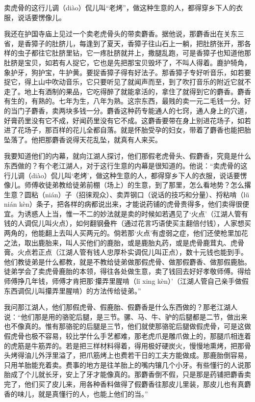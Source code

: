 \documentclass[12pt,UTF8]{ctexbook}
\begin{document}
卖虎骨的这行儿调（diào）侃儿叫“老烤”，做这种生意的人，都得穿乡下人的衣服，说话要愣像儿。



我还在护国寺庙上见过一个卖老虎骨头的带卖麝香。据他说，那麝香出在关东三省，是香獐子的肚脐儿，每逢到了夏天，香獐子往山石上一躺，把肚脐张开，那各样的虫子都往它肚脐里钻，它一疼肚脐就并上，撒腿乱跑，可是香獐子也知道他那肚脐是宝贝，如若有人捉它，它也是先把那宝贝毁坏了，不叫人得着。鹿护犄角，象护牙，狗护宝，牛护黄。要捉香獐子得有好法子。那香獐子专好听音乐，如若要捉它，得上山中吹动音乐，它只要听见了就闻声而至，到了吹打音乐的附近它就不走了。地上有酒制的果品，它吃得醉了就能拿活的，拿住了就得到它的麝香。麝香有生的，有熟的。七年为生，八年为熟。这宗东西，最贱的卖一元二毛钱一分。好的当门子麝香，卖两块多钱一分。麝香这种药专能通人的七窍，通人身上的穴道，好膏药里没有它不成，好闻药里没有它不成。这麝香要带在身上别进花场子，如若进了花场子，那百样的花儿全都自落。就是怀胎受孕的妇女，带着了麝香也能把胎坠落了。他把那麝香说得天花乱坠，就真有人来买。

我要知道他们的内幕，就向江湖人探讨，他们那假老虎骨头、假麝香，究竟是什么东西做的？有个老江湖人，对于这行生意的内幕是很知道的。他说：“卖虎骨的这行儿调（diào）侃儿叫‘老烤’，做这种生意的人，都得穿乡下人的衣服，说话要愣像儿。师傅收徒弟教给徒弟前棚（场上）的生意，到了那里，怎么看地势？怎么撂生意？圆粘（nián）子（招徕观众）、卖弄钢口（说话的技巧和分量）、捋粘啃（lǖ nián kèn）条子，把各样的病都说出来，才能说药铺的虎骨贵得多，他们卖得很便宜。为诱惑人上当，惟一不二的妙法就是卖的时候如若遇见了‘火点’（江湖人管有钱的人调侃儿叫火点），如何翻钢叠杵（通过花言巧语使买主翻倍付钱），人家想买两角的，他能翻上去叫人买两元的。倘若那‘火点’有虚弱之症，他们还使枪里加花之法，取出鹿胎来，叫人买他们的鹿胎，或是鹿胎丸药，或是虎骨鹿茸丸、虎骨膏。火点若正点（江湖人管有钱人忠厚朴实调侃儿叫正点），数十元钱也能到手。他们教徒弟是什么都教，就是不教给徒弟做那假虎骨、做那假麝香、做那假鹿胎。徒弟学会了卖虎骨鹿胎的本领，得往各处做生意，卖了钱回去好好孝敬师傅。得给师傅挣几年钱，师傅才肯把那‘攥弄里腥啃（lǐ xing kèn）’（江湖人管自己亲手做假东西调侃儿叫攥弄里腥啃）的方法传给徒弟。”

我问那江湖人，他们那假虎骨、假鹿胎、假麝香是什么东西做的？那老江湖人说：“他们那是用的骆驼后腿，是三节。骡、马、牛、驴的后腿都是二节，做出来也不像真的。惟有那骆驼的后腿是三节，他们就使那骆驼后腿做假虎骨，可是这做假虎骨也极不容易，较比学什么手艺都难，那老虎爪是雕爪做上的，那腿爪相连着的虎筋是牛筋弄的。若是把三样材料得着，得用极好硬炭火，慢慢地熏烤，把那骨头烤得油儿外浮里溢了，把爪筋烤上也费若干日的工夫方能做成。那鹿胎倒容易，只用羊胎能充着卖。费事的地方是往羊胎上的嘴内镶几个小牙。有些懂行的人说那胎成了个儿就长牙，安上了牙才能像真的。那麝香倒不假，只是那是药铺把麝香卖完了，他们买了皮儿来，用各种香料做得了假麝香往那皮儿里装，那皮儿也有真麝香的味儿，就是真懂行的人，也能上他们的当。”
\end{document}
